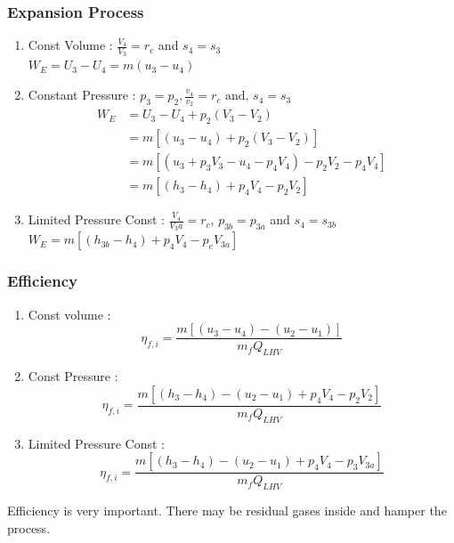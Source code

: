 \documentclass{article}
\begin{document}
\begin{multicols}{2}
	\subsubsection*{Expansion Process}
	\begin{enumerate}
		\item Const Volume : $\frac{V_4}{V_3} = r_c$ and $s_4=s_3$\\
		$W_E = U_3 - U_4 = m(u_3-u_4)$
		\item Constant Pressure : $p_3 = p_2, \frac{v_4}{v_2} = r_c \text{ and, } s_4 = s_3$ \\
		\begin{align*}
			W_E &= U_3 - U_4 + p_2(V_3 - V_2) \\
			&= m\left[(u_3-u_4)+ p_2(V_3-V_2)\right] \\
			&= m\left[(u_3 +p_3V_3-u_4-p_4V_4) - p_2V_2 - p_4V_4 \right] \\ 
			&= m\left[(h_3-h_4)+ p_4V_4 - p_2V_2\right]
		\end{align*}
		\item Limited Pressure Const : $\frac{V_4}{V_3a} = r_c$, $p_{3b}=p_{3a}$ and $s_4=s_{3b}$
		$W_E = m\left[(h_{3b}-h_4) + p_4V_4 - p_eV_{3a}\right]$
	\end{enumerate}

	\subsubsection*{Efficiency}
	\begin{enumerate}
		\item Const volume : $$\eta_{f,i} = \frac{m\left[(u_3-u_4)-(u_2-u_1)\right]}{m_fQ_{LHV}}$$
		\item Const Pressure : $$\eta_{f,i} = \frac{m\left[(h_3-h_4)-(u_2-u_1) + p_4V_4 - p_2V_2\right]}{m_fQ_{LHV}}$$
		\item Limited Pressure Const : $$\eta_{f,i} = \frac{m\left[(h_3-h_4)-(u_2-u_1) + p_4V_4 - p_3V_{3a}\right]}{m_fQ_{LHV}}$$
	\end{enumerate}
  \end{multicols}
\vspace*{0.5cm}
  \textbullet Efficiency is very important. There may be residual gases inside and hamper the process.
\end{document}
